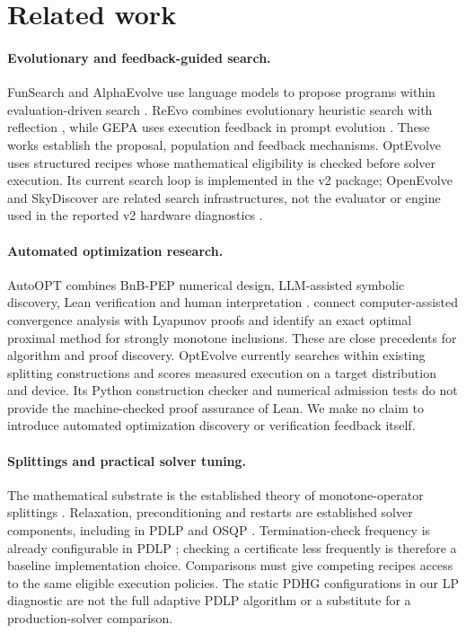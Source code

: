 \section{Related work}

\paragraph{Evolutionary and feedback-guided search.}
FunSearch and AlphaEvolve use language models to propose programs within
evaluation-driven search \citep{RomeraParedes2023Mathematical,Novikov2025AlphaEvolve}.
ReEvo combines evolutionary heuristic search with reflection
\citep{Ye2024ReEvo}, while GEPA uses execution feedback in prompt evolution
\citep{Agrawal2025GEPA}. These works establish the proposal, population and
feedback mechanisms. OptEvolve uses structured recipes whose mathematical
eligibility is checked before solver execution. Its current search loop is
implemented in the v2 package; OpenEvolve and SkyDiscover are related search
infrastructures, not the evaluator or engine used in the reported v2 hardware
diagnostics \citep{Sharma2025OpenEvolve,Liu2026SkyDiscover}.

\paragraph{Automated optimization research.}
AutoOPT combines BnB-PEP numerical design, LLM-assisted symbolic discovery,
Lean verification and human interpretation \citep{Kim2026AutoOPT}.
\citet{Yoon2026Lyapunov} connect computer-assisted convergence analysis with
Lyapunov proofs and identify an exact optimal proximal method for strongly
monotone inclusions. These are close precedents for algorithm and proof
discovery. OptEvolve currently searches within existing splitting constructions
and scores measured execution on a target distribution and device. Its Python
construction checker and numerical admission tests do not provide the
machine-checked proof assurance of Lean. We make no claim to introduce
automated optimization discovery or verification feedback itself.

\paragraph{Splittings and practical solver tuning.}
The mathematical substrate is the established theory of monotone-operator
splittings \citep{RyuYin2022LargeScale,ChambollePock2011First,Condat2013Primal,
Vu2013Splitting,DavisYin2017Three}. Relaxation, preconditioning and restarts
are established solver components, including in PDLP and OSQP
\citep{Applegate2021Practical,Stellato2020OSQP}. Termination-check frequency
is already configurable in PDLP \citep{ORToolsPDLP2026}; checking a certificate
less frequently is therefore a baseline implementation choice. Comparisons
must give competing recipes access to the same eligible execution policies.
The static PDHG configurations in our LP diagnostic are not the full adaptive
PDLP algorithm or a substitute for a production-solver comparison.

